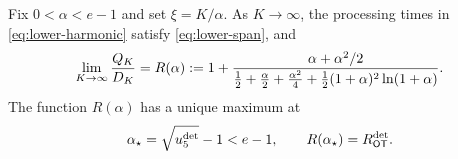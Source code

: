 \begin{claim}
\label{clm:lower-smooth-limit}
Fix $0<\alpha<e-1$ and set $\xi=K/\alpha$.  As $K\to\infty$, the
processing times in \cref{eq:lower-harmonic} satisfy
\cref{eq:lower-span}, and
\begin{equation}
 \lim_{K\to\infty}\frac{Q_K}{D_K}
 =R(\alpha)
 \mathrel{:=} 1+
 \frac{\alpha+\alpha^2/2}
 {\frac12+\frac\alpha2+\frac{\alpha^2}{4}
  +\frac12(1+\alpha)^2\ln(1+\alpha)}.
 \label{eq:lower-Ralpha}
\end{equation}
The function $R(\alpha)$ has a unique maximum at
\begin{equation}
 \alpha_\star=\sqrt{u_{5}^{\mathrm{det}}}-1<e-1,
 \qquad R(\alpha_\star)=R_{\mathsf{OT}}^{\mathrm{det}}.
 \label{eq:lower-alpha-star}
\end{equation}
\end{claim}

